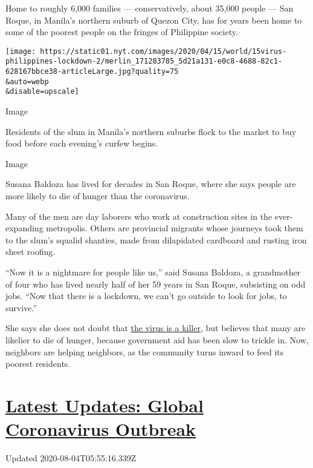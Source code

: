 Home to roughly 6,000 families --- conservatively, about 35,000 people
--- San Roque, in Manila's northern suburb of Quezon City, has for years
been home to some of the poorest people on the fringes of Philippine
society.

\texttt{[image: https://static01.nyt.com/images/2020/04/15/world/15virus-philippines-lockdown-2/merlin\_171283785\_5d21a131-e0c8-4688-82c1-628167bbce38-articleLarge.jpg?quality=75\\\&auto=webp\\\&disable=upscale]}

Image

Residents of the slum in Manila's northern suburbs flock to the market
to buy food before each evening's curfew begins.

Image

Susana Baldoza has lived for decades in San Roque, where she says people
are more likely to die of hunger than the coronavirus.

Many of the men are day laborers who work at construction sites in the
ever-expanding metropolis. Others are provincial migrants whose journeys
took them to the slum's squalid shanties, made from dilapidated
cardboard and rusting iron sheet roofing.

``Now it is a nightmare for people like us,'' said Susana Baldoza, a
grandmother of four who has lived nearly half of her 59 years in San
Roque, subsisting on odd jobs. ``Now that there is a lockdown, we can't
go outside to look for jobs, to survive.''

She says she does not doubt that
\href{https://www.nytimes.com/2020/02/02/world/asia/philippines-coronavirus-china.html}{the
virus is a killer}, but believes that many are likelier to die of
hunger, because government aid has been slow to trickle in. Now,
neighbors are helping neighbors, as the community turns inward to feed
its poorest residents.

\hypertarget{latest-updates-global-coronavirus-outbreak}{%
\section{\texorpdfstring{\href{https://www.nytimes.com/2020/08/03/world/coronavirus-covid-19.html?action=click\&pgtype=Article\&state=default\&region=MAIN_CONTENT_1\&context=storylines_live_updates}{Latest
Updates: Global Coronavirus
Outbreak}}{Latest Updates: Global Coronavirus Outbreak}}\label{latest-updates-global-coronavirus-outbreak}}

Updated 2020-08-04T05:55:16.339Z

